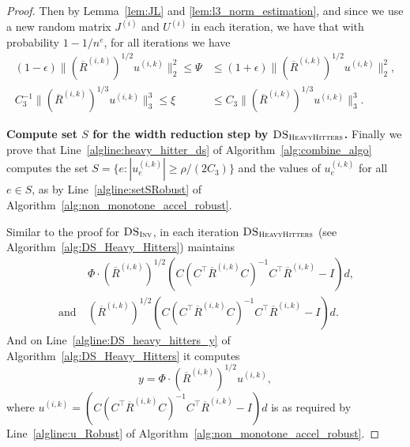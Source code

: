 \documentclass[11pt]{article}
\newcommand\dd{\boldsymbol{\mathit{d}}}
\newcommand\uu{\boldsymbol{\mathit{u}}}
\newcommand\CC{\boldsymbol{\mathit{C}}}
\newcommand\II{\boldsymbol{\mathit{I}}}
\newcommand\JJ{\boldsymbol{\mathit{J}}}
\newcommand\RR{\boldsymbol{\mathit{R}}}
\newcommand\UU{\boldsymbol{\mathit{U}}}
\newcommand{\ov}{\overline}
\begin{document}
\begin{proof}
Then by Lemma~\ref{lem:JL} and \ref{lem:l3_norm_estimation}, and since we use a new random matrix $\JJ^{(i)}$ and $\UU^{(i)}$ in each iteration, we have that with probability $1 - 1/n^e$, for all iterations we have
\begin{align*}
(1 - \epsilon) \|(\ov{\RR}^{(i,k)})^{1/2} \uu^{(i,k)} \|_2^2 \leq \Psi & \leq (1 + \epsilon) \|(\ov{\RR}^{(i,k)})^{1/2} \uu^{(i,k)} \|_2^2, \\
C_3^{-1} \|(\ov{\RR}^{(i,k)})^{1/3} \uu^{(i,k)} \|_3^3 \leq \xi & \leq C_3 \|(\ov{\RR}^{(i,k)})^{1/3} \uu^{(i,k)} \|_3^3.
\end{align*}


{\bf Compute set $S$ for the width reduction step by $\textsc{DS}_{\textsc{HeavyHitters}}$.} Finally we prove that Line~\ref{algline:heavy_hitter_ds} of Algorithm~\ref{alg:combine_algo} computes the set $S = \{e : |\uu^{(i,k)}_e|\geq \rho/(2C_3)\}$ and the values of $\uu^{(i,k)}_e$ for all $e \in S$, as by Line~\ref{algline:setSRobust} of Algorithm~\ref{alg:non_monotone_accel_robust}. 

Similar to the proof for $\textsc{DS}_{\textsc{Inv}}$, in each iteration $\textsc{DS}_{\textsc{HeavyHitters}}$ (see Algorithm~\ref{alg:DS_Heavy_Hitters}) maintains
\begin{align*}
&~ \Phi \cdot (\ov{\RR}^{(i,k)})^{1/2} (\CC (\CC^{\top} \ov{\RR}^{(i,k)} \CC)^{-1} \CC^{\top} \ov{\RR}^{(i,k)} - \II) \dd, \\
~ \text{and} &~ (\ov{\RR}^{(i,k)})^{1/2} (\CC (\CC^{\top} \ov{\RR}^{(i,k)} \CC)^{-1} \CC^{\top} \ov{\RR}^{(i,k)} - \II) \dd.
\end{align*}
And on Line~\ref{algline:DS_heavy_hitters_y} of Algorithm~\ref{alg:DS_Heavy_Hitters} it computes
\[
y = \Phi \cdot (\ov{\RR}^{(i,k)})^{1/2} \uu^{(i,k)},
\]
where $\uu^{(i,k)} = (\CC (\CC^{\top} \ov{\RR}^{(i,k)} \CC)^{-1} \CC^{\top} \ov{\RR}^{(i,k)} - \II) \dd$ is as required by Line~\ref{algline:u_Robust} of Algorithm~\ref{alg:non_monotone_accel_robust}.


\end{proof}
\end{document}
